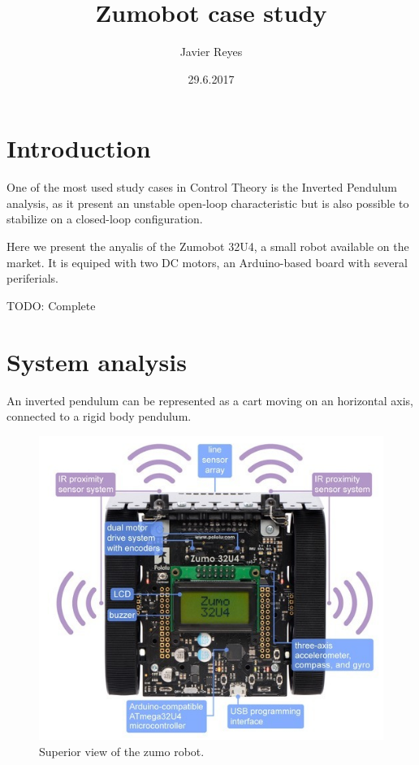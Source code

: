 \documentclass{article}
\title{Zumobot case study}
\date{29.6.2017}
\author{Javier Reyes}
\begin{document}
\maketitle
{}
\newpage
{}

\tableofcontents
\newpage

\section*{Introduction}

One of the most used study cases in Control Theory is the Inverted Pendulum analysis, as it present an unstable open-loop characteristic but is also possible to stabilize on a closed-loop configuration.

Here we present the anyalis of the Zumobot 32U4, a small robot available on the market. It is equiped with two DC motors, an Arduino-based board with several periferials.

TODO: Complete

\section{System analysis}

An inverted pendulum can be represented as a cart moving on an horizontal axis, connected to a rigid body pendulum.

\begin{figure}[h!]
	\includegraphics{img/zumo-superior.png}
	\centering
	\caption{Superior view of the zumo robot.}
	\label{fig:sup-zumo}
\end{figure}
\end{document}
